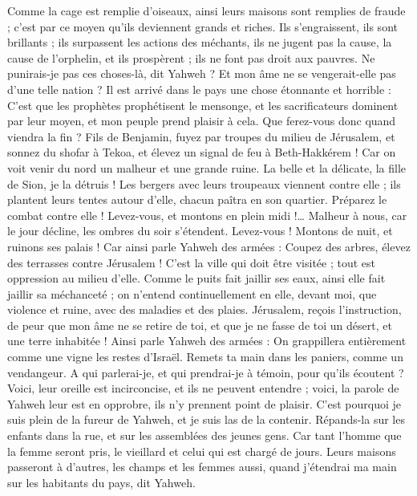 \begin{multicols}{2}
Comme la cage est remplie d'oiseaux, ainsi leurs maisons sont remplies de fraude ; c'est par ce moyen qu'ils deviennent grands et riches.
Ils s'engraissent, ils sont brillants ; ils surpassent les actions des méchants, ils ne jugent pas la cause, la cause de l'orphelin, et ils prospèrent ; ils ne font pas droit aux pauvres.
Ne punirais-je pas ces choses-là, dit Yahweh ? Et mon âme ne se vengerait-elle pas d'une telle nation ?
Il est arrivé dans le pays une chose étonnante et horrible :
C'est que les prophètes prophétisent le mensonge, et les sacrificateurs dominent par leur moyen, et mon peuple prend plaisir à cela. Que ferez-vous donc quand viendra la fin ?
\VerseOne{}Fils de Benjamin, fuyez par troupes du milieu de Jérusalem, et sonnez du shofar à Tekoa, et élevez un signal de feu à Beth-Hakkérem ! Car on voit venir du nord un malheur et une grande ruine.
La belle et la délicate, la fille de Sion, je la détruis !
Les bergers avec leurs troupeaux viennent contre elle ; ils plantent leurs tentes autour d'elle, chacun paîtra en son quartier.
Préparez le combat contre elle ! Levez-vous, et montons en plein midi !… Malheur à nous, car le jour décline, les ombres du soir s'étendent.
Levez-vous ! Montons de nuit, et ruinons ses palais !
Car ainsi parle Yahweh des armées : Coupez des arbres, élevez des terrasses contre Jérusalem ! C'est la ville qui doit être visitée ; tout est oppression au milieu d'elle.
Comme le puits fait jaillir ses eaux, ainsi elle fait jaillir sa méchanceté ; on n'entend continuellement en elle, devant moi, que violence et ruine, avec des maladies et des plaies.
Jérusalem, reçois l'instruction, de peur que mon âme ne se retire de toi, et que je ne fasse de toi un désert, et une terre inhabitée !
Ainsi parle Yahweh des armées : On grappillera entièrement comme une vigne les restes d'Israël. Remets ta main dans les paniers, comme un vendangeur.
A qui parlerai-je, et qui prendrai-je à témoin, pour qu'ils écoutent ? Voici, leur oreille est incirconcise, et ils ne peuvent entendre ; voici, la parole de Yahweh leur est en opprobre, ils n'y prennent point de plaisir.
C'est pourquoi je suis plein de la fureur de Yahweh, et je suis las de la contenir. Répands-la sur les enfants dans la rue, et sur les assemblées des jeunes gens. Car tant l'homme que la femme seront pris, le vieillard et celui qui est chargé de jours.
Leurs maisons passeront à d'autres, les champs et les femmes aussi, quand j'étendrai ma main sur les habitants du pays, dit Yahweh.

\end{multicols}
